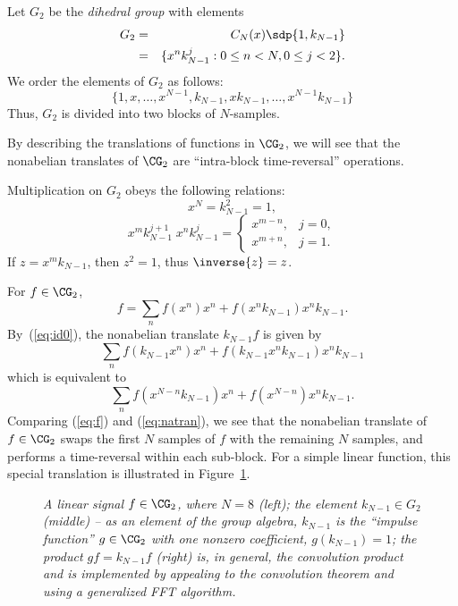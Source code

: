 Let $G_2$ be the \emph{dihedral group} %
with elements
\begin{eqnarray*}
G_2&=& C_N(x) \sdp \{1, k_{N-1}\}\\
&=& \{x^n k_{N-1}^j : 0 \leq n < N, 0 \leq j < 2\}.
\end{eqnarray*}
We order the elements of $G_2$ as follows:
\[
\{1, x, \ldots, x^{N-1}, k_{N-1}, xk_{N-1}, \ldots, x^{N-1}
k_{N-1}\}
\]
Thus, $G_2$ is divided into two blocks of $N$-samples.

By describing the translations of functions in $\CG_2$, 
we will see that the nonabelian translates of
$\CG_2$ are ``intra-block time-reversal'' operations.

Multiplication on $G_2$ obeys the following relations:
\begin{equation}\label{eq:id0}
  x^N = k_{N-1}^2 = 1,
\end{equation}
\begin{equation}
  x^mk_{N-1}^{j+1} \; x^nk_{N-1}^j = 
  \begin{cases} 
    x^{m-n}, & j=0,\\
    x^{m+n}, & j=1.
  \end{cases}
\end{equation}
If $z=x^mk_{N-1}$, then $z^2=1$, thus $\inverse{z}=z$.

For $f\in \CG_2$, 
\begin{equation}\label{eq:f}
  f = \sum_n f(x^n)x^n + f(x^n k_{N-1})x^n k_{N-1}.
\end{equation}
By~(\ref{eq:id0}), the nonabelian translate $k_{N-1}f$
is given by
\[
\sum_n f(k_{N-1}x^n)x^n + f(k_{N-1}x^n k_{N-1})x^n k_{N-1}
\]
which is equivalent to 
\begin{equation}\label{eq:natran}
\sum_n f(x^{N-n} k_{N-1})x^n + f(x^{N-n}) x^n k_{N-1}.
\end{equation}
Comparing (\ref{eq:f}) and (\ref{eq:natran}), we see that
the nonabelian translate of $f\in \CG_2$ swaps the first $N$
samples of $f$ with the remaining $N$ samples, and performs
a time-reversal within each sub-block.
For a simple linear function, this special translation is
illustrated in Figure~\ref{fig:G2trans}.

\begin{figure}
\centerline{}
\caption{{\small {\it A linear signal $f\in \CG_2$, where $N
    = 8$ (left); the element $k_{N-1} \in G_2$ (middle) --
    as an element of the group algebra, $k_{N-1}$ is the ``impulse
    function'' $g \in \CG_2$ with one nonzero coefficient,
    $g(k_{N-1}) =1$; the product $gf = k_{N-1}f$ (right) is,
    in general, the convolution product and is implemented
    by appealing to the convolution theorem and using a 
    generalized FFT algorithm.}}}
    \label{fig:G2trans}
\end{figure}





